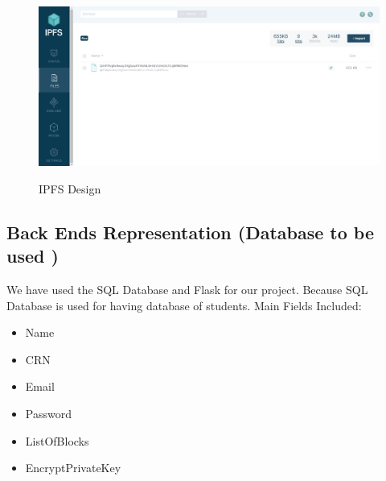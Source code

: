\begin{figure}[H]
    \centering
    \includegraphics[scale=0.37]{images/ipfs-UI.jpeg}\\[0.5cm]
    \caption{IPFS Design}
    \label{fig:my_label}
\end{figure}
\subsection{Back Ends Representation (Database to be used )}
We have used the SQL Database and Flask for our project. Because SQL Database is used for having database of students.
Main Fields Included:
\begin{itemize}
    \item Name
    \item CRN
    \item Email
    \item Password
    \item ListOfBlocks
    \item EncryptPrivateKey
\end{itemize}
